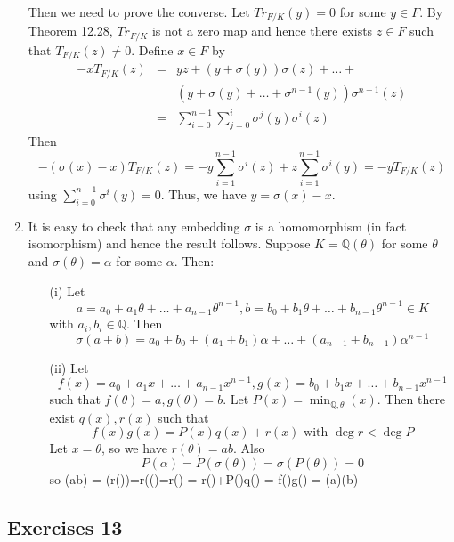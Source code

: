 \begin{enumerate}
    Then we need to prove the converse. Let $Tr_{F/K}(y)=0$ for some $y \in F$. By Theorem 12.28, $Tr_{F/K}$ is not a zero map and hence there exists $z \in F$ such that $T_{F/K}(z) \neq 0$.
    Define $x \in F$ by
    \begin{eqnarray*}
    -x T_{F/K}(z)&=&yz+\left(y+\sigma(y)\right)\sigma(z)+\ldots+\\
    &~&\left(y+\sigma(y)+\ldots+\sigma^{n-1}(y)\right)
    \sigma^{n-1}(z)\\
    &=&\sum_{i=0}^{n-1} \sum_{j=0}^i\sigma^{j}(y)\sigma^i(z)
    \end{eqnarray*}
    Then
    $$-\left(\sigma(x)-x\right)T_{F/K}(z)=-y\sum_{i=1}^{n-1} \sigma^{i}(z) +z\sum_{i=1}^{n-1}\sigma^i(y)
    =-yT_{F/K}(z)$$
    using $\sum_{i=0}^{n-1} \sigma^i (y)=0$. Thus, we have $y=\sigma(x)-x$.
\item It is easy to check that any embedding $\sigma$ is a homomorphism (in fact isomorphism) and hence the result follows. Suppose $K=\mathbb{Q}(\theta)$ for some $\theta$ and $\sigma(\theta)=\alpha$ for some $\alpha$. Then:
    \begin{enumerate}
    \item[(i)] Let
    $$a=a_0+a_1\theta+\ldots+a_{n-1}\theta^{n-1}, b=b_0+b_1\theta+\ldots+b_{n-1}\theta^{n-1} \in K$$
    with $a_i, b_i \in \mathbb{Q}$. Then
    $$\sigma(a+b)=a_0+b_0+(a_1+b_1)\alpha+\ldots+(a_{n-1}+b_{n-1})\alpha^{n-1}$$
    \item[(ii)] Let
    $$f(x)=a_0+a_1x+\ldots+a_{n-1}x^{n-1}, g(x)=b_0+b_1x+\ldots+b_{n-1}x^{n-1}$$
    such that $f(\theta)=a,g(\theta)=b$. Let $P(x)=\min_{\mathbb{Q},\theta}(x)$.
    Then there exist $q(x),r(x)$ such that
    $$f(x)g(x)=P(x)q(x)+r(x) \text{ with } \deg{r} < \deg{P}$$
    Let $x=\theta$, so we have $r(\theta)=ab$.
    Also
    $$P(\alpha)=P(\sigma(\theta))=\sigma(P(\theta))=0$$
    so
    \be
    \sigma(ab) = \sigma(r(\theta))=r(\sigma(\theta)=r(\alpha) = r(\alpha)+P(\alpha)q(\alpha)  = f(\alpha)g(\alpha) = \sigma(a)\sigma(b)
    \ee
    \end{enumerate}
\end{enumerate}

\subsection{Exercises 13}

